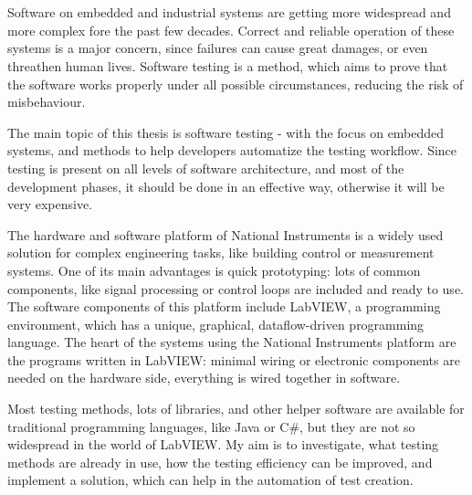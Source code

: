 \chapter{\bevezetes}

Software on embedded and industrial systems are getting more widespread and more complex fore the past few decades. Correct and reliable operation of these systems is a major concern, since failures can cause great damages, or even threathen human lives. Software testing is a method, which aims to prove that the software works properly under all possible circumstances, reducing the risk of misbehaviour.

The main topic of this thesis is software testing - with the focus on embedded systems, and methods to help developers automatize the testing workflow. Since testing is present on all levels of software architecture, and most of the development phases, it should be done in an effective way, otherwise it will be very expensive. 

The hardware and software platform of National Instruments is a widely used solution for complex engineering tasks, like building control or measurement systems. One of its main advantages is quick prototyping: lots of common components, like signal processing or control loops are included and ready to use. The software components of this platform include LabVIEW, a programming environment, which has a unique, graphical, dataflow-driven programming language. The heart of the systems using the National Instruments platform are the programs written in LabVIEW: minimal wiring or electronic components are needed on the hardware side, everything is wired together in software.

Most testing methods, lots of libraries, and other helper software are available for traditional programming languages, like Java or C\#, but they are not so widespread in the world of LabVIEW. My aim is to investigate, what testing methods are already in use, how the testing efficiency can be improved, and implement a solution, which can help in the automation of test creation.


\pagebreak
